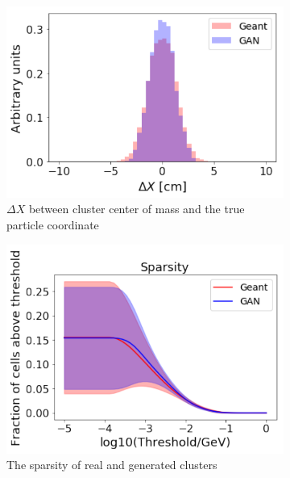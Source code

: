 \begin{figure}
\begin{subfigure}[b]{0.35\textwidth}
    \includegraphics[width=1\textwidth]{figures/deltaX.pdf}
    \caption{$\Delta X$ between cluster center of mass and the true particle coordinate}
  \end{subfigure}\hspace{0.2\textwidth}
  \begin{subfigure}[b]{0.35\textwidth}
    \centering
    \includegraphics[width=1\textwidth]{figures/sparsity.pdf}
    \caption{The sparsity of real and generated clusters}
  \end{subfigure}
  \begin{subfigure}[b]{0.35\textwidth}
    \centering

\end{subfigure}
\end{figure}
